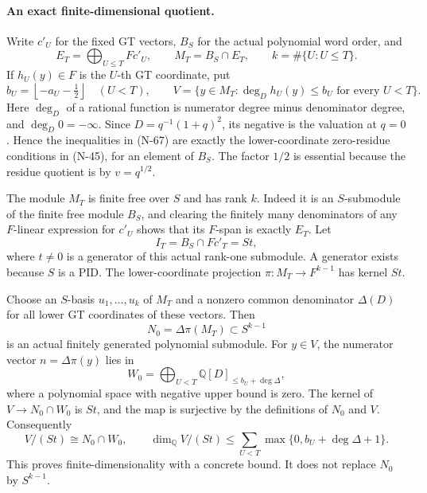 \paragraph{An exact finite-dimensional quotient.}
Write $c'_U$ for the fixed GT vectors, $B_S$ for the actual
polynomial word order, and
\[
 E_T=\bigoplus_{U\le T}F c'_U,\qquad
 M_T=B_S\cap E_T,
 \qquad k=\#\{U:U\le T\}.
 \tag{N-66}
\]
If $h_U(y)\in F$ is the $U$-th GT coordinate, put
\[
 b_U=\left\lfloor-a_U-\tfrac12\right\rfloor\quad(U<T),
 \qquad
 V=\{y\in M_T:\deg_D h_U(y)\le b_U\text{ for every }U<T\}.
 \tag{N-67}
\]
Here $\deg_D$ of a rational function is numerator degree
minus denominator degree, and $\deg_D0=-\infty$.
Since $D=q^{-1}(1+q)^2$, its negative is the valuation at
$q=0$.  Hence the inequalities in (N-67) are exactly the
lower-coordinate zero-residue conditions in (N-45), for
an element of $B_S$.  The factor $1/2$ is essential because
the residue quotient is by $v=q^{1/2}$.

The module $M_T$ is finite free over $S$ and has rank $k$.
Indeed it is an $S$-submodule of the finite free module
$B_S$, and clearing the finitely many denominators of any
$F$-linear expression for $c'_U$ shows that its $F$-span is
exactly $E_T$.  Let
\[
 I_T=B_S\cap F c'_T=S t,
 \tag{N-68}
\]
where $t\ne0$ is a generator of this actual rank-one
submodule.  A generator exists because $S$ is a PID.
The lower-coordinate projection
$\pi:M_T\to F^{k-1}$ has kernel $S t$.

Choose an $S$-basis $u_1,\ldots,u_k$ of $M_T$ and a nonzero
common denominator $\Delta(D)$ for all lower GT coordinates
of these vectors.  Then
\[
 N_0=\Delta\pi(M_T)\subset S^{k-1}
 \tag{N-69}
\]
is an actual finitely generated polynomial submodule.
For $y\in V$, the numerator vector
$n=\Delta\pi(y)$ lies in
\[
 W_0=\bigoplus_{U<T}\mathbb Q[D]_{\le b_U+\deg\Delta},
 \tag{N-70}
\]
where a polynomial space with negative upper bound is zero.
The kernel of $V\to N_0\cap W_0$ is $S t$, and the map is
surjective by the definitions of $N_0$ and $V$.
Consequently
\[
 V/(S t)\cong N_0\cap W_0,
 \qquad
 \dim_{\mathbb Q}V/(S t)
 \le\sum_{U<T}\max\{0,b_U+\deg\Delta+1\}.
 \tag{N-71}
\]
This proves finite-dimensionality with a concrete bound.
It does not replace $N_0$ by $S^{k-1}$.

